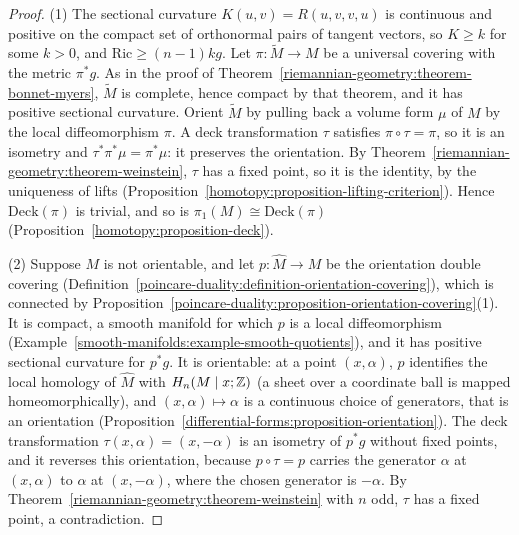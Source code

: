 \begin{proof}
(1) The sectional curvature $K(u, v) = R(u, v, v, u)$ is continuous and positive on the compact set of orthonormal pairs of tangent vectors, so $K \geq k$ for some $k > 0$,
and $\mathrm{Ric} \geq (n - 1)kg$. Let $\pi \colon \widetilde{M} \to M$ be a universal covering with the metric $\pi^*g$. As in the proof of
Theorem~\ref{riemannian-geometry:theorem-bonnet-myers}, $\widetilde{M}$ is complete, hence compact by that theorem, and it has positive sectional curvature. Orient
$\widetilde{M}$ by pulling back a volume form $\mu$ of $M$ by the local diffeomorphism $\pi$. A deck transformation $\tau$ satisfies $\pi \circ \tau = \pi$, so it is an isometry
and $\tau^*\pi^*\mu = \pi^*\mu$: it preserves the orientation. By Theorem~\ref{riemannian-geometry:theorem-weinstein}, $\tau$ has a fixed point, so it is the identity, by the
uniqueness of lifts (Proposition~\ref{homotopy:proposition-lifting-criterion}). Hence $\mathrm{Deck}(\pi)$ is trivial, and so is $\pi_1(M) \cong \mathrm{Deck}(\pi)$
(Proposition~\ref{homotopy:proposition-deck}).

(2) Suppose $M$ is not orientable, and let $p \colon \widehat{M} \to M$ be the orientation double covering (Definition~\ref{poincare-duality:definition-orientation-covering}),
which is connected by Proposition~\ref{poincare-duality:proposition-orientation-covering}(1). It is compact, a smooth manifold for which $p$ is a local diffeomorphism
(Example~\ref{smooth-manifolds:example-smooth-quotients}), and it has positive sectional curvature for $p^*g$. It is orientable: at a point $(x, \alpha)$, $p$ identifies the
local homology of $\widehat{M}$ with $H_n(M \mid x; \mathbb{Z})$ (a sheet over a coordinate ball is mapped homeomorphically), and $(x, \alpha) \mapsto \alpha$ is a continuous choice of
generators, that is an orientation (Proposition~\ref{differential-forms:proposition-orientation}). The deck transformation $\tau(x, \alpha) = (x, -\alpha)$ is an isometry of
$p^*g$ without fixed points, and it reverses this orientation, because $p \circ \tau = p$ carries the generator $\alpha$ at $(x, \alpha)$ to $\alpha$ at $(x, -\alpha)$, where the
chosen generator is $-\alpha$. By Theorem~\ref{riemannian-geometry:theorem-weinstein} with $n$ odd, $\tau$ has a fixed point, a contradiction.
\end{proof}

